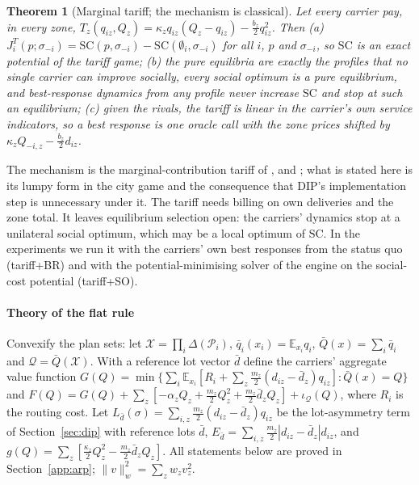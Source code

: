 \documentclass[preprint,11pt]{elsarticle}
\newtheorem{theorem}{Theorem}
\theoremstyle{definition}
\theoremstyle{remark}
\newcommand{\E}{\mathbb{E}}
\newcommand{\cP}{\mathcal{P}}
\newcommand{\cQ}{\mathcal{Q}}
\newcommand{\cX}{\mathcal{X}}
\begin{document}
\begin{theorem}[Marginal tariff; the mechanism is classical]\label{thm:mct}
Let every carrier pay, in every zone, $T_z(q_{iz},Q_z)=\kappa_zq_{iz}(Q_z-q_{iz})-\tfrac{b_z}{2}q_{iz}^2$. Then (a) $J^T_i(p;\sigma_{-i})=\mathrm{SC}(p,\sigma_{-i})-\mathrm{SC}(\emptyset_i,\sigma_{-i})$ for all $i$, $p$ and $\sigma_{-i}$, so $\mathrm{SC}$ is an exact potential of the tariff game; (b) the pure equilibria are exactly the profiles that no single carrier can improve socially, every social optimum is a pure equilibrium, and best-response dynamics from any profile never increase $\mathrm{SC}$ and stop at such an equilibrium; (c) given the rivals, the tariff is linear in the carrier's own service indicators, so a best response is one oracle call with the zone prices shifted by $\kappa_zQ_{-i,z}-\tfrac{b_z}{2}d_{iz}$.
\end{theorem}
The mechanism is the marginal-contribution tariff of \citet{Wolpert2001}, \citet{Sandholm2002} and \citet{Marden2013}; what is stated here is its lumpy form in the city game and the consequence that DIP's implementation step is unnecessary under it. The tariff needs billing on own deliveries and the zone total. It leaves equilibrium selection open: the carriers' dynamics stop at a unilateral social optimum, which may be a local optimum of $\mathrm{SC}$. In the experiments we run it with the carriers' own best responses from the status quo (tariff+BR) and with the potential-minimising solver of the engine on the social-cost potential (tariff+SO).

\paragraph{Theory of the flat rule} Convexify the plan sets: let $\cX=\prod_i\Delta(\cP_i)$, $\bar q_i(x_i)=\E_{x_i}q_i$, $\bar Q(x)=\sum_i\bar q_i$ and $\cQ=\bar Q(\cX)$. With a reference lot vector $\bar d$ define the carriers' aggregate value function $G(Q)=\min\{\sum_i\E_{x_i}[R_i+\sum_z\tfrac{m_z}{2}(d_{iz}-\bar d_z)q_{iz}]:\bar Q(x)=Q\}$ and $F(Q)=G(Q)+\sum_z[-\alpha_zQ_z+\tfrac{m_z}{2}Q_z^2+\tfrac{m_z}{2}\bar d_zQ_z]+\iota_{\cQ}(Q)$, where $R_i$ is the routing cost. Let $L_{\bar d}(\sigma)=\sum_{i,z}\tfrac{m_z}{2}(d_{iz}-\bar d_z)q_{iz}$ be the lot-asymmetry term of Section~\ref{sec:dip} with reference lots $\bar d$, $E_{\bar d}=\sum_{i,z}\tfrac{m_z}{2}|d_{iz}-\bar d_z|d_{iz}$, and $g(Q)=\sum_z[\tfrac{\kappa_z}{2}Q_z^2-\tfrac{m_z}{2}\bar d_zQ_z]$. All statements below are proved in Section~\ref{app:arp}; $\|v\|_w^2=\sum_zw_zv_z^2$.
\end{document}
